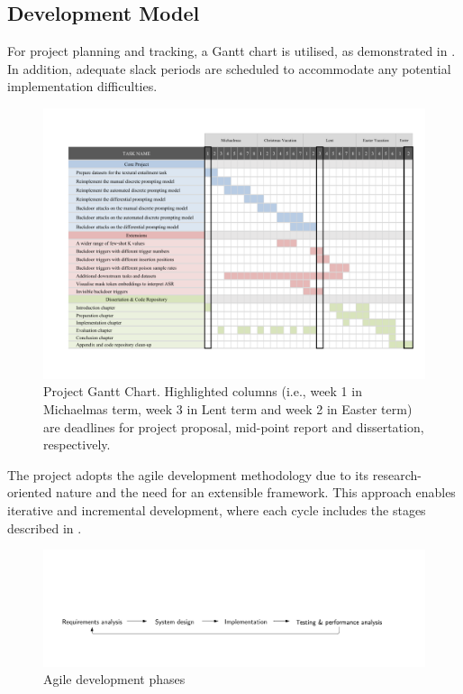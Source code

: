 \subsection{Development Model}
For project planning and tracking, a Gantt chart is utilised, as demonstrated in . In addition, adequate slack periods are scheduled to accommodate any potential implementation difficulties.
\begin{figure}[!ht]
    \centering
    \includegraphics[width=\hsize]{figures/preparation_media/diss-gantt-chart.pdf}
    \caption{Project Gantt Chart. Highlighted columns (i.e., week 1 in Michaelmas term, week 3 in Lent term and week 2 in Easter term) are deadlines for project proposal, mid-point report and dissertation, respectively.}
    \label{fig:prepare-diss-gantt-chart}
\end{figure}

\vspace{-1em}
The project adopts the agile development methodology due to its research-oriented nature and the need for an extensible framework. This approach enables iterative and incremental development, where each cycle includes the stages described in .
\begin{figure}[!ht]
    \centering
    \includegraphics[width=\hsize]{figures/preparation_media/agile.pdf}
    \caption{Agile development phases}
    \label{fig:agile}
\end{figure}
\vspace{-0.8em}

